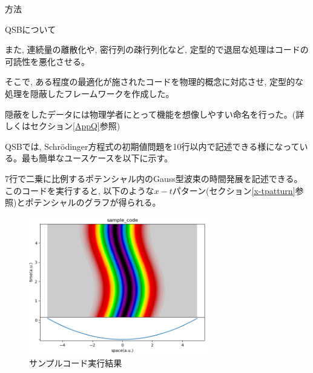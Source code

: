 \documentclass[a4paper, lualatex]{bxjsarticle}
\begin{document}
\begin{section}{方法}
\begin{subsection}{QSBについて}
    \par また, 連続量の離散化や, 密行列の疎行列化など, 定型的で退屈な処理はコードの可読性を悪化させる。
    \par そこで, ある程度の最適化が施されたコードを物理的概念に対応させ, 定型的な処理を隠蔽したフレームワークを作成した。
    \par 隠蔽をしたデータには物理学者にとって機能を想像しやすい命名を行った。(詳しくはセクション\ref{AppQ}参照)
    \par QSBでは, Schrödinger方程式の初期値問題を10行以内で記述できる様になっている。最も簡単なユースケースを以下に示す。
    
        7行で二乗に比例するポテンシャル内のGauss型波束の時間発展を記述できる。このコードを実行すると, 以下のような$x-t$パターン(セクション\ref{x-tpatturn}参照)とポテンシャルのグラフが得られる。
    \begin{figure}[h]
        \centering
        \includegraphics[width=8cm]{sample_code.png}
        \caption{サンプルコード実行結果}
    \end{figure}
    \end{subsection}
\end{section}

\newpage
\end{document}
